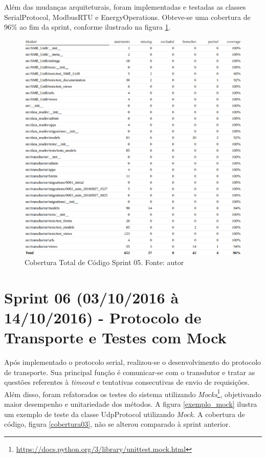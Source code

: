 Além das mudanças arquiteturais, foram implementadas e testadas as classes SerialProtocol, ModbusRTU e EnergyOperations. Obteve-se uma cobertura de 96\% ao fim da sprint, conforme ilustrado na figura \ref{cobertura02}.
\begin{figure}[!htpb]
    \centering
    \includegraphics[keepaspectratio=true,scale=0.6]{figuras/cobertura02.eps}
    \caption{Cobertura Total de Código Sprint 05. Fonte: autor}
    \label{cobertura02}
\end{figure}

\section{Sprint 06 (03/10/2016 à 14/10/2016) - Protocolo de Transporte e Testes com Mock}
Após implementado o protocolo serial, realizou-se o desenvolvimento do protocolo de transporte. Sua principal função é comunicar-se com o transdutor e tratar as questões referentes à \textit{timeout} e tentativas consecutivas de envio de requisições. Além disso, foram refatorados os testes do sistema utilizando \textit{Mocks}\footnote{\url{https://docs.python.org/3/library/unittest.mock.html}}, objetivando maior desempenho e unitariedade dos métodos. A figura \ref{exemplo_mock} ilustra um exemplo de teste da classe UdpProtocol utilizando \textit{Mock}. A cobertura de código, figura \ref{cobertura03}, não se alterou comparado à sprint anterior.

